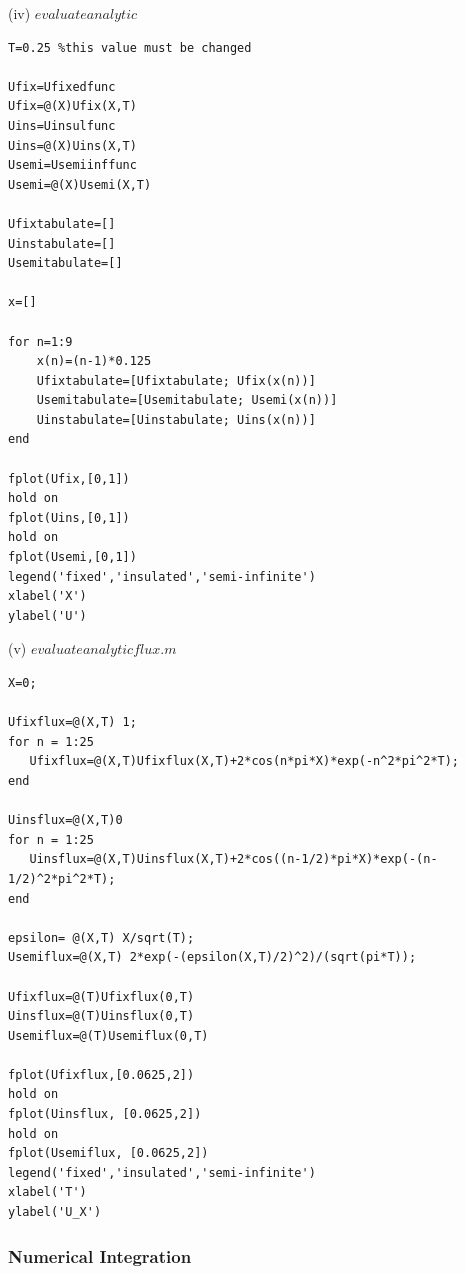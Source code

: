 \documentclass[10pt,a4paper]{report}
\begin{document}
(iv) $evaluateanalytic$
\begin{verbatim}
T=0.25 %this value must be changed

Ufix=Ufixedfunc
Ufix=@(X)Ufix(X,T)
Uins=Uinsulfunc
Uins=@(X)Uins(X,T)
Usemi=Usemiinffunc
Usemi=@(X)Usemi(X,T)

Ufixtabulate=[]
Uinstabulate=[]
Usemitabulate=[]

x=[]

for n=1:9
    x(n)=(n-1)*0.125
    Ufixtabulate=[Ufixtabulate; Ufix(x(n))]
    Usemitabulate=[Usemitabulate; Usemi(x(n))]
    Uinstabulate=[Uinstabulate; Uins(x(n))] 
end

fplot(Ufix,[0,1])
hold on
fplot(Uins,[0,1])
hold on
fplot(Usemi,[0,1])
legend('fixed','insulated','semi-infinite')
xlabel('X')
ylabel('U')
\end{verbatim}
\vspace{0.5cm}

(v) $evaluateanalyticflux.m$
\begin{verbatim}
X=0;
 
Ufixflux=@(X,T) 1;
for n = 1:25
   Ufixflux=@(X,T)Ufixflux(X,T)+2*cos(n*pi*X)*exp(-n^2*pi^2*T);
end
      
Uinsflux=@(X,T)0
for n = 1:25
   Uinsflux=@(X,T)Uinsflux(X,T)+2*cos((n-1/2)*pi*X)*exp(-(n-1/2)^2*pi^2*T);    
end
    
epsilon= @(X,T) X/sqrt(T);
Usemiflux=@(X,T) 2*exp(-(epsilon(X,T)/2)^2)/(sqrt(pi*T));
    
Ufixflux=@(T)Ufixflux(0,T)
Uinsflux=@(T)Uinsflux(0,T)
Usemiflux=@(T)Usemiflux(0,T)

fplot(Ufixflux,[0.0625,2])
hold on
fplot(Uinsflux, [0.0625,2])
hold on
fplot(Usemiflux, [0.0625,2])
legend('fixed','insulated','semi-infinite')
xlabel('T')
ylabel('U_X')
\end{verbatim}
\vspace{1cm}

\newpage

\subsubsection*{Numerical Integration}
\vspace{0.5cm}
\end{document}
